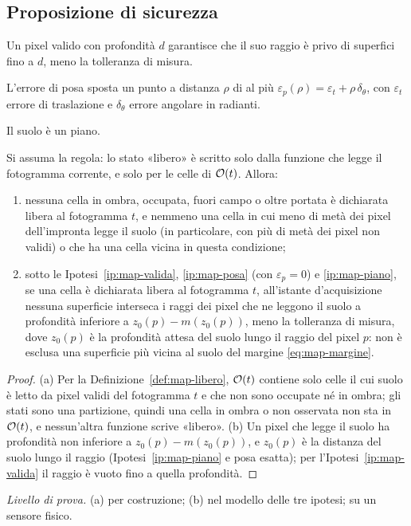 \subsection{Proposizione di sicurezza}\label{sec:map-sicurezza}

\begin{ipotesi}[Profondità valida = giusta]\label{ip:map-valida} Un pixel valido con profondità $d$ garantisce che il suo raggio è privo di superfici fino a $d$, meno la tolleranza di misura.\end{ipotesi}
\begin{ipotesi}\label{ip:map-posa} L'errore di posa sposta un punto a distanza $\rho$ di al più $\varepsilon_p(\rho)=\varepsilon_t+\rho\,\delta_\theta$, con $\varepsilon_t$ errore di traslazione e $\delta_\theta$ errore angolare in radianti.\end{ipotesi}
\begin{ipotesi}\label{ip:map-piano} Il suolo è un piano.\end{ipotesi}

\begin{proposizione}\label{prop:map-sicurezza}
Si assuma la regola: lo stato «libero» è scritto solo dalla funzione che legge il fotogramma corrente, e solo per le celle di $\mathcal{O}(t)$. Allora:
\begin{enumerate}[label=(\alph*)]
\item nessuna cella in ombra, occupata, fuori campo o oltre portata è dichiarata libera al fotogramma $t$, e nemmeno una cella in cui meno di metà dei pixel dell'impronta legge il suolo (in particolare, con più di metà dei pixel non validi) o che ha una cella vicina in questa condizione;
\item sotto le Ipotesi~\ref{ip:map-valida}, \ref{ip:map-posa} (con $\varepsilon_p=0$) e \ref{ip:map-piano}, se una cella è dichiarata libera al fotogramma $t$, all'istante d'acquisizione nessuna superficie interseca i raggi dei pixel che ne leggono il suolo a profondità inferiore a $z_0(p)-m(z_0(p))$, meno la tolleranza di misura, dove $z_0(p)$ è la profondità attesa del suolo lungo il raggio del pixel $p$: non è esclusa una superficie più vicina al suolo del margine \eqref{eq:map-margine}.
\end{enumerate}
\end{proposizione}
\begin{proof}
(a) Per la Definizione~\ref{def:map-libero}, $\mathcal{O}(t)$ contiene solo celle il cui suolo è letto da pixel validi del fotogramma $t$ e che non sono occupate né in ombra; gli stati sono una partizione, quindi una cella in ombra o non osservata non sta in $\mathcal{O}(t)$, e nessun'altra funzione scrive «libero». (b) Un pixel che legge il suolo ha profondità non inferiore a $z_0(p)-m(z_0(p))$, e $z_0(p)$ è la distanza del suolo lungo il raggio (Ipotesi~\ref{ip:map-piano} e posa esatta); per l'Ipotesi~\ref{ip:map-valida} il raggio è vuoto fino a quella profondità.
\end{proof}
\emph{Livello di prova.} (a)  per costruzione; (b)  nel modello delle tre ipotesi;  su un sensore fisico.

